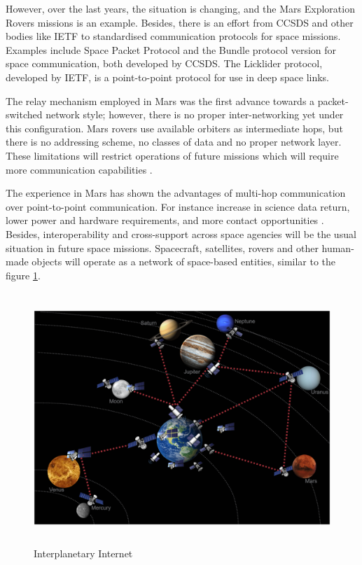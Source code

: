 However, over the last years, the situation is changing, and the Mars Exploration Rovers missions is an example. Besides, there is an effort from CCSDS and other bodies like IETF to standardised communication protocols for space missions. Examples include Space Packet Protocol and the Bundle protocol version for space communication, both developed by CCSDS. The Licklider protocol, developed by IETF, is a point-to-point protocol for use in deep space links.   %

The relay mechanism employed in Mars was the first advance towards a packet-switched network style; however, there is no proper inter-networking yet under this configuration. Mars rovers use available orbiters as intermediate hops, but there is no addressing scheme, no classes of data and no proper network layer. These limitations will restrict operations of future missions which will require more communication capabilities \cite{rationale2010requirements}. 


The experience in Mars has shown the advantages of multi-hop communication over point-to-point communication. For instance increase in science data return, lower power and hardware requirements, and more contact opportunities \cite{rationale2010requirements}.  Besides, interoperability and cross-support across space agencies will be the usual situation in future space missions. Spacecraft, satellites, rovers and other human-made objects will operate as a network of space-based entities, similar to the figure \ref{fig:inter-internet}. 



\begin{figure}[ht]
\centering
\includegraphics[width=1 \linewidth, height=9.5cm]{images/interplanetary.png} 
\caption{Interplanetary Internet}
\label{fig:inter-internet}
\end{figure}


